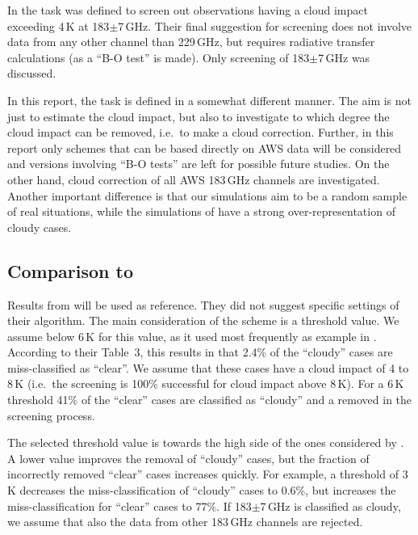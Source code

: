 \documentclass[12pt]{article}
\begin{document}
In \citet{rekha2012potential} the task was defined to screen out observations
having a cloud impact exceeding 4\,K at 183$\pm$7\,GHz. Their final suggestion
for screening does not involve data from any other channel than 229\,GHz, but
requires radiative transfer calculations (as a ``B-O test'' is made). Only 
screening of 183$\pm$7\,GHz was discussed.

In this report, the task is defined in a somewhat different manner. The aim is
not just to estimate the cloud impact, but also to investigate to which degree
the cloud impact can be removed, i.e.\ to make a cloud correction. Further, in
this report only schemes that can be based directly on AWS data will be
considered and versions involving ``B-O tests'' are left for possible future
studies. On the other hand, cloud correction of all AWS 183\,GHz channels are
investigated. Another important difference is that our simulations aim to be a
random sample of real situations, while the simulations of
\citet{rekha2012potential} have a strong over-representation of cloudy
cases.



\subsection{Comparison to \citet{rekha2012potential}}
%
Results from \citet{rekha2012potential} will be used as reference. They did not
suggest specific settings of their algorithm. The main consideration of the
scheme is a threshold value. We assume below 6\,K for
this value, as it used most frequently as example in
\citet{rekha2012potential}. According to their Table~3, this results in that
2.4\% of the ``cloudy'' cases are miss-classified as ``clear''. We assume that
these cases have a cloud impact of 4 to 8\,K (i.e.\ the screening is 100\%
successful for cloud impact above 8\,K). For a 6\,K threshold 41\% of the
``clear'' cases are classified as ``cloudy'' and a removed in the screening
process. 

The selected threshold value is towards the high side of the ones considered by 
\citet{rekha2012potential}. A lower value improves the removal of ``cloudy'' cases,
but the fraction of incorrectly removed ``clear'' cases increases quickly. For
example, a threshold of 3\,K decreases the miss-classification of ``cloudy''
cases to 0.6\%, but increases the miss-classification for ``clear'' cases to 77\%.
If 183$\pm$7\,GHz is classified as cloudy, we assume that also the data from
other 183\,GHz channels are rejected.
\end{document}

